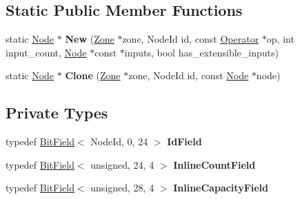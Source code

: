 \subsection*{Static Public Member Functions}
\begin{DoxyCompactItemize}
\item 
static \hyperlink{classv8_1_1internal_1_1compiler_1_1_node}{Node} $\ast$ {\bfseries New} (\hyperlink{classv8_1_1internal_1_1_zone}{Zone} $\ast$zone, Node\+Id id, const \hyperlink{classv8_1_1internal_1_1compiler_1_1_operator}{Operator} $\ast$op, int input\+\_\+count, \hyperlink{classv8_1_1internal_1_1compiler_1_1_node}{Node} $\ast$const $\ast$inputs, bool has\+\_\+extensible\+\_\+inputs)\hypertarget{classv8_1_1internal_1_1compiler_1_1_node_a06bd4ebd8efe2f071787e5f21e7f5b49}{}\label{classv8_1_1internal_1_1compiler_1_1_node_a06bd4ebd8efe2f071787e5f21e7f5b49}

\item 
static \hyperlink{classv8_1_1internal_1_1compiler_1_1_node}{Node} $\ast$ {\bfseries Clone} (\hyperlink{classv8_1_1internal_1_1_zone}{Zone} $\ast$zone, Node\+Id id, const \hyperlink{classv8_1_1internal_1_1compiler_1_1_node}{Node} $\ast$node)\hypertarget{classv8_1_1internal_1_1compiler_1_1_node_a128b2d37dbcf38bb667390f45925a1a7}{}\label{classv8_1_1internal_1_1compiler_1_1_node_a128b2d37dbcf38bb667390f45925a1a7}

\end{DoxyCompactItemize}
\subsection*{Private Types}
\begin{DoxyCompactItemize}
\item 
typedef \hyperlink{classv8_1_1internal_1_1_bit_field}{Bit\+Field}$<$ Node\+Id, 0, 24 $>$ {\bfseries Id\+Field}\hypertarget{classv8_1_1internal_1_1compiler_1_1_node_afb68d74d911f80c23b4b1cc6cd056114}{}\label{classv8_1_1internal_1_1compiler_1_1_node_afb68d74d911f80c23b4b1cc6cd056114}

\item 
typedef \hyperlink{classv8_1_1internal_1_1_bit_field}{Bit\+Field}$<$ unsigned, 24, 4 $>$ {\bfseries Inline\+Count\+Field}\hypertarget{classv8_1_1internal_1_1compiler_1_1_node_a35cf5ce9fe00a201de78465e3686bd0c}{}\label{classv8_1_1internal_1_1compiler_1_1_node_a35cf5ce9fe00a201de78465e3686bd0c}

\item 
typedef \hyperlink{classv8_1_1internal_1_1_bit_field}{Bit\+Field}$<$ unsigned, 28, 4 $>$ {\bfseries Inline\+Capacity\+Field}\hypertarget{classv8_1_1internal_1_1compiler_1_1_node_acc5a8168b4ea170476ad8708cb0d2373}{}\label{classv8_1_1internal_1_1compiler_1_1_node_acc5a8168b4ea170476ad8708cb0d2373}

\end{DoxyCompactItemize}
